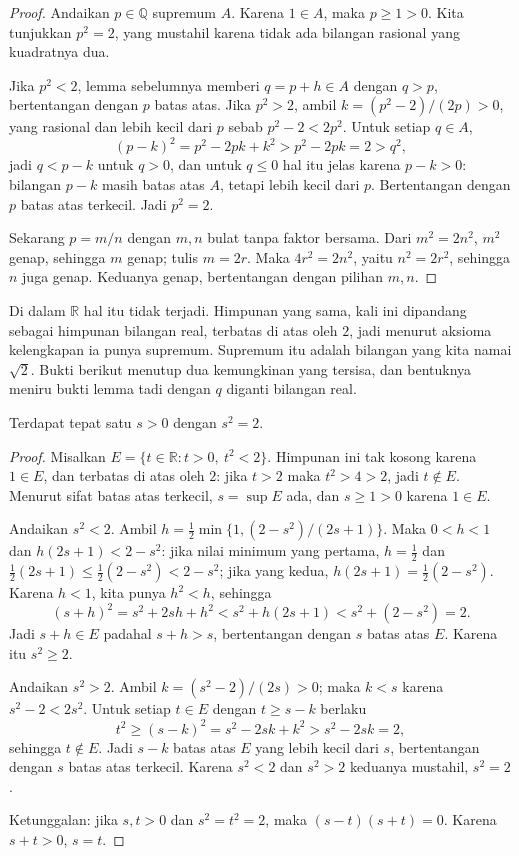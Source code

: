 \begin{proof}
Andaikan $p\in\mathbb{Q}$ supremum $A$. Karena $1\in A$, maka $p\ge 1>0$. Kita
tunjukkan $p^2=2$, yang mustahil karena tidak ada bilangan rasional yang kuadratnya dua.

Jika $p^2<2$, lemma sebelumnya memberi $q=p+h\in A$ dengan $q>p$, bertentangan dengan
$p$ batas atas. Jika $p^2>2$, ambil $k=(p^2-2)/(2p)>0$, yang rasional dan lebih kecil
dari $p$ sebab $p^2-2<2p^2$. Untuk setiap $q\in A$,
\[
(p-k)^2=p^2-2pk+k^2>p^2-2pk=2>q^2,
\]
jadi $q<p-k$ untuk $q>0$, dan untuk $q\le 0$ hal itu jelas karena $p-k>0$: bilangan
$p-k$ masih batas atas $A$, tetapi lebih kecil dari $p$.
Bertentangan dengan $p$ batas atas terkecil. Jadi $p^2=2$.

Sekarang $p=m/n$ dengan $m,n$ bulat tanpa faktor bersama. Dari $m^2=2n^2$, $m^2$ genap,
sehingga $m$ genap; tulis $m=2r$. Maka $4r^2=2n^2$, yaitu $n^2=2r^2$, sehingga $n$
juga genap. Keduanya genap, bertentangan dengan pilihan $m,n$.
\end{proof}

Di dalam $\mathbb{R}$ hal itu tidak terjadi. Himpunan yang sama, kali ini dipandang
sebagai himpunan bilangan real, terbatas di atas oleh $2$, jadi menurut aksioma
kelengkapan ia punya supremum. Supremum itu adalah bilangan yang kita namai $\sqrt{2}$.
Bukti berikut menutup dua kemungkinan yang tersisa, dan bentuknya meniru bukti lemma
tadi dengan $q$ diganti bilangan real.

\begin{teorema}
Terdapat tepat satu $s>0$ dengan $s^2=2$.
\end{teorema}

\begin{proof}
Misalkan $E=\{t\in\mathbb{R}: t>0,\ t^2<2\}$. Himpunan ini tak kosong karena $1\in E$,
dan terbatas di atas oleh $2$: jika $t>2$ maka $t^2>4>2$, jadi $t\notin E$. Menurut
sifat batas atas terkecil, $s=\sup E$ ada, dan $s\ge 1>0$ karena $1\in E$.

Andaikan $s^2<2$. Ambil $h=\frac12\min\{1,(2-s^2)/(2s+1)\}$. Maka $0<h<1$ dan
$h(2s+1)<2-s^2$: jika nilai minimum yang pertama, $h=\frac12$ dan
$\frac12(2s+1)\le\frac12(2-s^2)<2-s^2$; jika yang kedua, $h(2s+1)=\frac12(2-s^2)$.
Karena $h<1$, kita punya $h^2<h$, sehingga
\[
(s+h)^2=s^2+2sh+h^2<s^2+h(2s+1)<s^2+(2-s^2)=2 .
\]
Jadi $s+h\in E$ padahal $s+h>s$, bertentangan dengan $s$ batas atas $E$. Karena itu
$s^2\ge 2$.

Andaikan $s^2>2$. Ambil $k=(s^2-2)/(2s)>0$; maka $k<s$ karena $s^2-2<2s^2$. Untuk
setiap $t\in E$ dengan $t\ge s-k$ berlaku
\[
t^2\ge(s-k)^2=s^2-2sk+k^2>s^2-2sk=2,
\]
sehingga $t\notin E$. Jadi $s-k$ batas atas $E$ yang lebih kecil dari $s$, bertentangan
dengan $s$ batas atas terkecil. Karena $s^2<2$ dan $s^2>2$ keduanya mustahil, $s^2=2$.

Ketunggalan: jika $s,t>0$ dan $s^2=t^2=2$, maka $(s-t)(s+t)=0$. Karena $s+t>0$,
$s=t$.
\end{proof}

